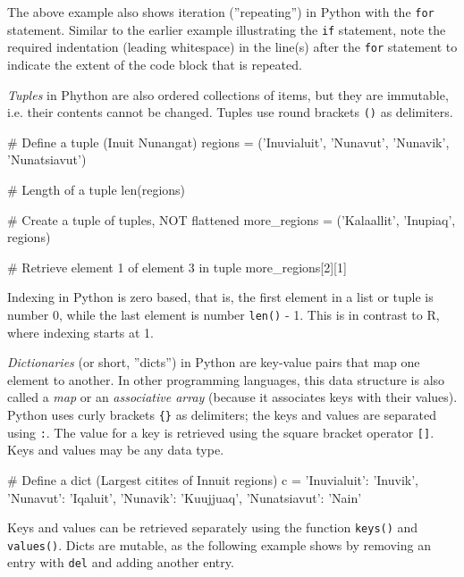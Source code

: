 The above example also shows iteration (''repeating'') in Python with the \texttt{for} statement. Similar to the earlier example illustrating the \texttt{if} statement, note the required indentation (leading whitespace) in the line(s) after the \texttt{for} statement to indicate the extent of the code block that is repeated.

\emph{Tuples} in Phython are also ordered collections of items, but they are immutable, i.e. their contents cannot be changed. Tuples use round brackets \texttt{()} as delimiters.

\begin{pythoncode}
# Define a tuple (Inuit Nunangat)
regions = ('Inuvialuit', 'Nunavut', 'Nunavik', 'Nunatsiavut')

# Length of a tuple
len(regions)

# Create a tuple of tuples, NOT flattened
more_regions = ('Kalaallit', 'Inupiaq', regions)

# Retrieve element 1 of element 3 in tuple
more_regions[2][1]
\end{pythoncode}

\begin{alertbox}Indexing in Python is zero based, that is, the first element in a list or tuple is number 0, while the last element is number \texttt{len()} - 1. This is in contrast to R, where indexing starts at 1.
\end{alertbox}

\emph{Dictionaries} (or short, ''dicts'') in Python are key-value pairs that map one element to another. In other programming languages, this data structure is also called a \emph{map} or an \emph{associative array} (because it associates keys with their values). Python uses curly brackets \texttt{\{\}} as delimiters; the keys and values are separated using \texttt{:}. The value for a key is retrieved using the square bracket operator \texttt{[]}. Keys and values may be any data type.

\begin{pythoncode}
# Define a dict (Largest citites of Innuit regions)
c = {
    'Inuvialuit': 'Inuvik',
    'Nunavut': 'Iqaluit',
    'Nunavik': 'Kuujjuaq',
    'Nunatsiavut': 'Nain' 
}
\end{pythoncode}

Keys and values can be retrieved separately using the function \texttt{keys()} and \texttt{values()}. Dicts are mutable, as the following example shows by removing an entry with \texttt{del} and adding another entry.

